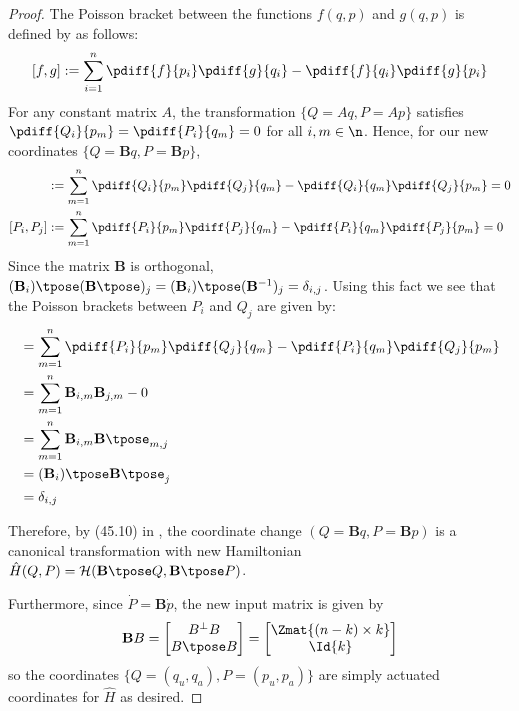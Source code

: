 \begin{proof}
    The Poisson bracket between the functions \(f(q,p)\) and \(g(q,p)\) is defined by
    \cite{landau_mechanics} as follows:
    \[
        [f,g] := \sum \limits_{i=1}^n \pdiff{f}{p_i}\pdiff{g}{q_i} - 
                \pdiff{f}{q_i}\pdiff{g}{p_i}
    \]
    For any constant matrix \(A\), the transformation
    \(\{Q = Aq, P = Ap\}\) satisfies
    \(\pdiff{Q_i}{p_m} = \pdiff{P_i}{q_m} = 0\) for all 
    \(i,m \in \n\).
    Hence, for our new coordinates \(\{Q = \mathbf{B}q, P = \mathbf{B}p\}\),
    \begin{align*}
        [Q_i,Q_j] &:= \sum\limits_{m = 1}^n \pdiff{Q_i}{p_m}\pdiff{Q_j}{q_m} - 
        \pdiff{Q_i}{q_m}\pdiff{Q_j}{p_m} = 0 \\
        [P_i,P_j] &:= \sum\limits_{m=1}^n \pdiff{P_i}{p_m}\pdiff{P_j}{q_m} -
        \pdiff{P_i}{q_m}\pdiff{P_j}{p_m} = 0
    \end{align*}
    Since the matrix \(\mathbf{B}\) is orthogonal,
    \((\mathbf{B}_i)\tpose (\mathbf{B}\tpose)_j = (\mathbf{B}_i)\tpose (\mathbf{B}^{-1})_j = \delta_{i,j}\). Using this
    fact we see that the Poisson brackets between \(P_i\) and \(Q_j\) are given by:
    \begin{align*}
        [P_i,Q_j] &= \sum\limits_{m=1}^n\pdiff{P_i}{p_m}\pdiff{Q_j}{q_m}
        - \pdiff{P_i}{q_m}\pdiff{Q_j}{p_m} \\
                  &= \sum\limits_{m=1}^n \mathbf{B}_{i,m}\mathbf{B}_{j,m} - 0 \\
                  &= \sum\limits_{m=1}^n \mathbf{B}_{i,m}\mathbf{B}\tpose_{m,j} \\
                  &= (\mathbf{B}_i)\tpose \mathbf{B}\tpose_j \\
                  &= \delta_{i,j}
    \end{align*}

    Therefore, by (45.10) in \cite{landau_mechanics}, the coordinate change 
    \((Q = \mathbf{B}q, P = \mathbf{B}p)\) is a canonical transformation with
    new Hamiltonian 
    \(\hat{H}(Q,P) = \mathcal{H}(\mathbf{B}\tpose Q,\mathbf{B}\tpose P)\).

    Furthermore, since \(\dot{P} = \mathbf{B}\dot{p}\), the new input matrix is
    given by 
    \[
        \mathbf{B}B = \begin{bmatrix}
            B^\perp B \\
            B\tpose B \\
        \end{bmatrix} = 
        \begin{bmatrix}
            \Zmat{(n-k)\times k} \\
            \Id{k}
        \end{bmatrix}
    \]
    so the coordinates \(\{Q = (q_u,q_a), P = (p_u,p_a)\}\) are simply actuated coordinates for 
    \(\hat{H}\) as desired.
\end{proof}

